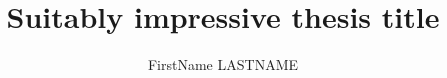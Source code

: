 \newcommand{\authorname}{FirstName LASTNAME}
\newcommand{\universityname}{Example University}
\newcommand{\facultyname}{Master's Degree -- Computer Science}

\title{Suitably impressive thesis title}
\author{\authorname}
\newcommand{\university}{\universityname}
\newcommand{\program}{\facultyname}
